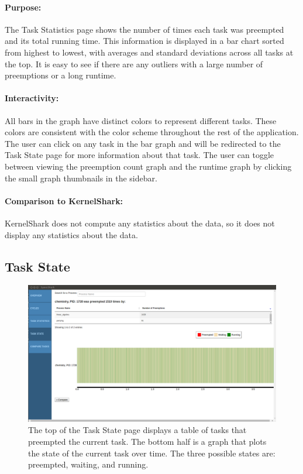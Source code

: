 \documentclass{hmcclinic}
\begin{document}
\paragraph{Purpose:}
The Task Statistics page shows the number of times each task was preempted and
its total running time. This information is displayed in a bar chart sorted from
highest to lowest, with averages and standard deviations across all tasks at the
top. It is easy to see if there are any outliers with a large number of
preemptions or a long runtime.

\paragraph{Interactivity:}
All bars in the graph have distinct colors to represent different tasks. These
colors are consistent with the color scheme throughout the rest of the
application. The user can click on any task in the bar graph and will be
redirected to the Task State page for more information about that task.
The user can toggle between viewing the preemption count graph and the runtime
graph by clicking the small graph thumbnails in the sidebar.

\paragraph{Comparison to KernelShark:} KernelShark does not compute any
statistics about the data, so it does not display any statistics about the data.


  \subsection{Task State}

  \begin{figure}[H]
  \includegraphics[scale=0.3]{task-state-page.png}
  \caption{The top of the Task State page displays a table of tasks
  that preempted the current task. The bottom half is a graph that plots the
state of the current task over time. The three possible states are: preempted,
waiting, and running.}
\end{figure}
\end{document}

